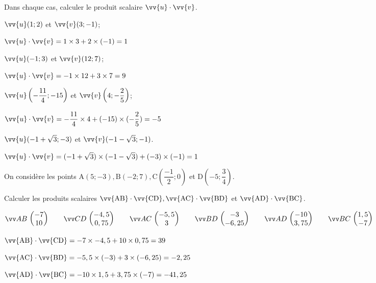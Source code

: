 \documentclass[11pt,a4paper]{article}  %
\begin{document}
Dans chaque cas, calculer le produit scalaire $\vv{u} \cdot \vv{v}$.
\begin{enumMet}
	\item $\vv{u}(1 ; 2)$ et $\vv{v}(3 ;-1)$;
	\begin{corrBox}
		$\vv{u}\cdot\vv{v}=1\times 3+2\times (-1)=1$
	\end{corrBox}
	\item $\vv{u}(-1 ; 3)$ et $\vv{v}(12 ; 7)$;
	\begin{corrBox}
		$\vv{u}\cdot\vv{v}=-1\times 12+3\times 7=9$
	\end{corrBox}
	\item $\vv{u}\left(-\dfrac{11}{4} ;-15\right)$ et $\vv{v}\left(4 ;-\dfrac{2}{5}\right)$;
	\begin{corrBox}
		$\vv{u}\cdot\vv{v}=-\dfrac{11}{4}\times 4+(-15)\times (-\dfrac{2}{5})=-5$
	\end{corrBox}
	\item $\vv{u}(-1+\sqrt{3} ;-3)$ et $\vv{v}(-1-\sqrt{3} ;-1)$.
	\begin{corrBox}
		$\vv{u}\cdot\vv{v}=(-1+\sqrt{3})\times (-1-\sqrt{3})+(-3)\times (-1)=1$
	\end{corrBox}
\end{enumMet}

\exercice{}

On considère les points $\mathrm{A}(5 ;-3), \mathrm{B}(-2 ; 7), \mathrm{C}\left(\dfrac{-1}{2} ; 0\right)$ et $\mathrm{D}\left(-5 ; \dfrac{3}{4}\right)$. 

Calculer les produits scalaires $\vv{\mathrm{AB}} \cdot \vv{\mathrm{CD}}, \vv{\mathrm{AC}} \cdot \vv{\mathrm{BD}}$ et $\vv{\mathrm{AD}} \cdot \vv{\mathrm{BC}}$.

\begin{corrBox}
	$\Coord{AB}{-7}{10} \quad \quad \Coord{CD}{-4,5}{0,75} \quad \quad \Coord{AC}{-5,5}{3}\quad \quad \Coord{BD}{-3}{-6,25} \quad \quad \Coord{AD}{-10}{3,75}\quad \quad \Coord{BC}{1,5}{-7}$
	
	$\vv{\mathrm{AB}} \cdot \vv{\mathrm{CD}}=-7\times -4,5+10\times 0,75=39$
	
	$\vv{\mathrm{AC}} \cdot \vv{\mathrm{BD}}=-5,5\times (-3)+3\times (-6,25)=-2,25$
	
	$\vv{\mathrm{AD}} \cdot \vv{\mathrm{BC}}=-10\times 1,5+3,75\times (-7)=-41,25$
	
		
\end{corrBox}

\exercice{}
\end{document}
